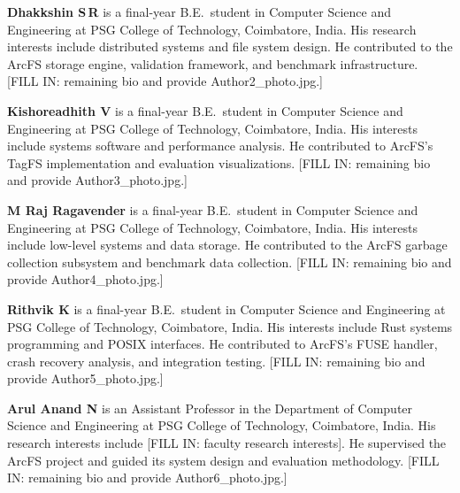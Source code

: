 \documentclass[5p,times]{elsarticle}
\begin{document}
\bigskip
\noindent\textbf{Dhakkshin S\,R} is a final-year B.E.\ student in
Computer Science and Engineering at PSG College of Technology, Coimbatore,
India. His research interests include distributed systems and file system
design. He contributed to the ArcFS storage engine, validation framework,
and benchmark infrastructure.
[FILL IN: remaining bio and provide Author2\_photo.jpg.]

\bigskip
\noindent\textbf{Kishoreadhith V} is a final-year B.E.\ student in
Computer Science and Engineering at PSG College of Technology, Coimbatore,
India. His interests include systems software and performance analysis.
He contributed to ArcFS's TagFS implementation and evaluation visualizations.
[FILL IN: remaining bio and provide Author3\_photo.jpg.]

\bigskip
\noindent\textbf{M Raj Ragavender} is a final-year B.E.\ student in
Computer Science and Engineering at PSG College of Technology, Coimbatore,
India. His interests include low-level systems and data storage. He
contributed to the ArcFS garbage collection subsystem and benchmark
data collection.
[FILL IN: remaining bio and provide Author4\_photo.jpg.]

\bigskip
\noindent\textbf{Rithvik K} is a final-year B.E.\ student in Computer
Science and Engineering at PSG College of Technology, Coimbatore, India.
His interests include Rust systems programming and POSIX interfaces. He
contributed to ArcFS's FUSE handler, crash recovery analysis, and
integration testing.
[FILL IN: remaining bio and provide Author5\_photo.jpg.]

\bigskip
\noindent\textbf{Arul Anand N} is an Assistant Professor in the
Department of Computer Science and Engineering at PSG College of
Technology, Coimbatore, India. His research interests include
[FILL IN: faculty research interests]. He supervised the ArcFS project
and guided its system design and evaluation methodology.
[FILL IN: remaining bio and provide Author6\_photo.jpg.]
\end{document}
